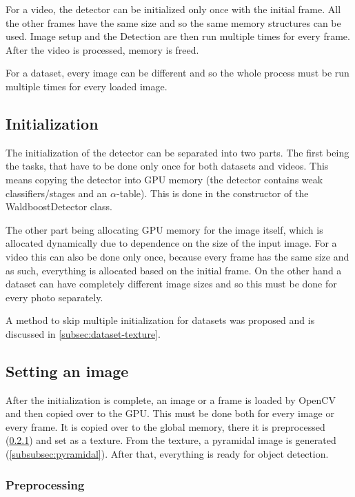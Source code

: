 For a video, the detector can be initialized only once with the initial frame. All the other frames have the same size and so the same memory structures can be used. Image setup and the Detection are then run multiple times for every frame. After the video is processed, memory is freed.

For a dataset, every image can be different and so the whole process must be run multiple times for every loaded image.

\subsection{Initialization}\label{subsec:init}

The initialization of the detector can be separated into two parts. The first being the tasks, that have to be done only once for both datasets and videos. This means copying the detector into GPU memory (the detector contains weak classifiers/stages and an $\alpha$-table). This is done in the constructor of the WaldboostDetector class.

The other part being allocating GPU memory for the image itself, which is allocated dynamically due to dependence on the size of the input image. For a video this can also be done only once, because every frame has the same size and as such, everything is allocated based on the initial frame. On the other hand a dataset can have completely different image sizes and so this must be done for every photo separately.

A method to skip multiple initialization for datasets was proposed and is discussed in \ref{subsec:dataset-texture}.

\subsection{Setting an image}

After the initialization is complete, an image or a frame is loaded by OpenCV and then copied over to the GPU. This must be done both for every image or every frame. It is copied over to the global memory, there it is preprocessed (\ref{subsubsec:grayscale}) and set as a texture. From the texture, a pyramidal image is generated (\ref{subsubsec:pyramidal}). After that, everything is ready for object detection.

\subsubsection{Preprocessing} \label{subsubsec:grayscale} 


